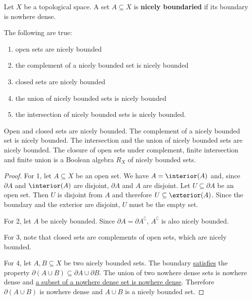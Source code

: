\begin{mathSection}
	\begin{defn}
		Let $X$ be a topological space. A set $A \subseteq X$ is \textbf{nicely boundaried} if its boundary is nowhere dense.
	\end{defn}
	
	\begin{prop}
		The following are true:
		\begin{enumerate}
			\item open sets are nicely bounded
			\item the complement of a nicely bounded set is nicely bounded
			\item closed sets are nicely bounded
			\item the union of nicely bounded sets is nicely bounded
			\item the intersection of nicely bounded sets is nicely bounded.
		\end{enumerate}
		
		Open and closed sets are nicely bounded. The complement of a nicely bounded set is nicely bounded. The intersection and the union of nicely bounded sets are nicely bounded. The closure of open sets under complement, finite intersection and finite union is a Boolean algebra $R_X$ of nicely bounded sets.
	\end{prop}
	
	\begin{proof}
		For 1, let $A \subseteq X$ be an open set. We have $A = \interior(A)$ and, since $\partial A$ and $\interior(A)$ are disjoint, $\partial A$ and $A$ are disjoint. Let $U \subseteq \partial A$ be an open set. Then $U$ is disjoint from $A$ and therefore $U \subseteq \exterior(A)$. Since the boundary and the exterior are disjoint, $U$ must be the empty set.
		
		For 2, let $A$ be nicely bounded. Since $\partial A = \partial A^{\complement}$, $A^{\complement}$ is also nicely bounded.
		
		For 3, note that closed sets are complements of open sets, which are nicely bounded.
		
		For 4, let $A, B \subseteq X$ be two nicely bounded sets. The boundary \href{https://proofwiki.org/wiki/Boundary_of_Union_is_Subset_of_Union_of_Boundaries}{satisfies} the property $\partial (A \cup B) \subseteq \partial A \cup \partial B$. The union of two nowhere dense sets is nowhere dense and \href{https://proofwiki.org/wiki/Subset_of_Nowhere_Dense_Subset_is_Nowhere_Dense}{a subset of a nowhere dense set is nowhere dense}. Therefore $\partial (A \cup B)$ is nowhere dense and $A \cup B$ is a nicely bounded set.
		

\end{proof}
\end{mathSection}
